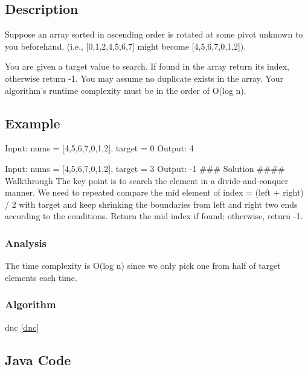 \documentclass[]{book}
\begin{document}
\hypertarget{description-11}{%
\subsection{Description}\label{description-11}}

Suppose an array sorted in ascending order is rotated at some pivot unknown to you beforehand.
(i.e., {[}0,1,2,4,5,6,7{]} might become {[}4,5,6,7,0,1,2{]}).

You are given a target value to search. If found in the array return its index, otherwise return -1. You may
assume no duplicate exists in the array. Your algorithm's runtime complexity must be in the order of O(log n).

\hypertarget{example-10}{%
\subsection{Example}\label{example-10}}

Input: nums = {[}4,5,6,7,0,1,2{]}, target = 0
Output: 4

Input: nums = {[}4,5,6,7,0,1,2{]}, target = 3
Output: -1
\#\#\# Solution
\#\#\#\# Walkthrough
The key point is to search the element in a divide-and-conquer manner. We need to repeated compare the
mid element of index = (left + right) / 2 with target and keep shrinking the boundaries from left and right two ends
according to the conditions. Return the mid index if found; otherwise, return -1.

\hypertarget{analysis-12}{%
\subsubsection{Analysis}\label{analysis-12}}

The time complexity is O(log n) since we only pick one from half of target elements each time.

\hypertarget{algorithm-12}{%
\subsubsection{Algorithm}\label{algorithm-12}}

dnc \ref{dnc}

\hypertarget{java-code-10}{%
\subsection{Java Code}\label{java-code-10}}
\end{document}
